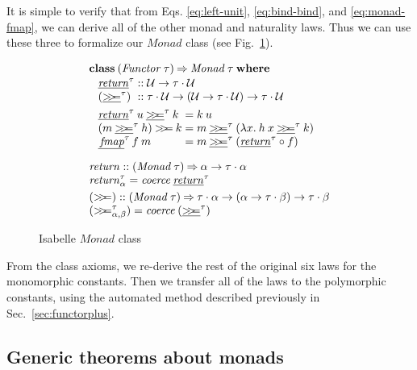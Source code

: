 \documentclass{sigplanconf}
\newcommand{\hsbind}{\mathbin{>\mkern-6mu>\mkern-6.5mu=}}
\newcommand{\To}{\mathbin{\Rightarrow}}
\newcommand{\U}{\ensuremath{\mathcal{U}}}
\newcommand{\univ}[1]{\ensuremath{\underline{#1}}}
\newcommand{\kwd}[1]{\mathbf{#1}}
\newcommand{\hsc}[1]{\ensuremath{\mathit{#1}}}
\newcommand{\hscoerce}{\hsc{coerce}}
\newcommand{\fmap}{\,\hsc{fmap}} %
\newcommand{\fmapU}{\univ{\fmap}}
\newcommand{\hsbindU}{\mathbin{\univ{\hsbind}}}
\newcommand{\tA}{\alpha}
\newcommand{\tB}{\beta}
\newcommand{\tT}{\tau}
\theoremstyle{definition}
\begin{document}
It is simple to verify that from Eqs. \eqref{eq:left-unit}, \eqref{eq:bind-bind}, and \eqref{eq:monad-fmap}, we can derive all of the other monad and naturality laws. Thus we can use these three to formalize our \hsc{Monad} class (see Fig.~\ref{fig:class-monad}).
%
\begin{figure}
\begin{align*}
  & \kwd{class}\:(\hsc{Functor}\:\tT)\To\hsc{Monad}\:\tT\:\kwd{where}
  \\[-\jot]
  & \hspace{8pt}
  \begin{alignedat}{2}
    & \univ{\hsc{return}}^\tT&&::\U\to\tT\cdot\U \\[-\jot]
    & (\hsbindU^\tT)&&::\tT\cdot\U\to(\U\to\tT\cdot\U)\to\tT\cdot\U
  \end{alignedat} \\
  & \hspace{8pt}
  \begin{alignedat}{3}
    & \univ{\hsc{return}}^\tT\:{u}\hsbindU^\tT{k} &&= {k}\:{u} \\[-\jot]
    & ({m} \hsbindU^\tT {h})\hsbind{k}
    &&= {m} \hsbindU^\tT (\lambda{x}.\:{h}\:{x} \hsbindU^\tT {k}) \\[-\jot]
    & \fmapU^\tT\,f\:m &&= m \hsbindU^\tT (\univ{\hsc{return}}^\tT \circ f)
  \end{alignedat}
  \\[\medskipamount]
  & \hsc{return} :: (\hsc{Monad}\:\tT) \To \tA\to\tT\cdot\tA \\[-\jot]
  & \hsc{return}^\tT_\tA = \hscoerce\:\univ{\hsc{return}}^\tT \\
  & (\hsbind) :: (\hsc{Monad}\:\tT) \To \tT\cdot\tA \to (\tA \to \tT\cdot\tB) \to \tT\cdot\tB
  \\[-\jot]
  & (\hsbind^\tT_{\tA,\tB}) = \hscoerce\:(\hsbindU^\tT)
\end{align*}
\caption{Isabelle \hsc{Monad} class}
\label{fig:class-monad}
\end{figure}

From the class axioms, we re-derive the rest of the original six laws for the monomorphic constants. Then we transfer all of the laws to the polymorphic constants, using the automated method described previously in Sec.~\ref{sec:functorplus}.

\subsection{Generic theorems about monads}
\end{document}
